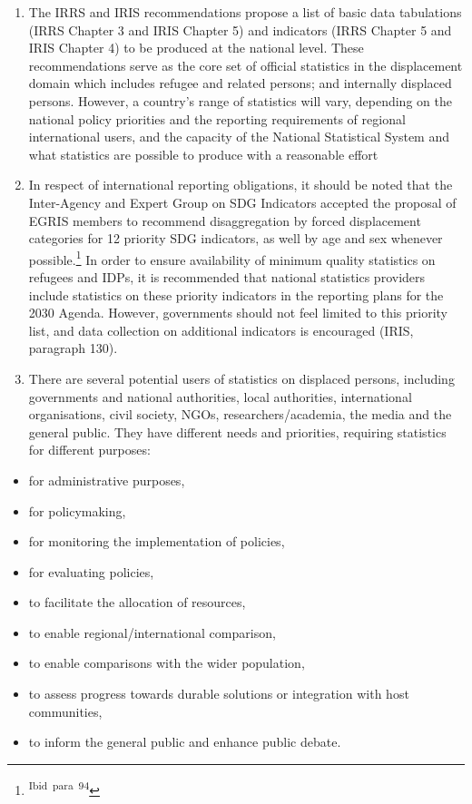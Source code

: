 \documentclass[
]{article}
\begin{document}
\begin{enumerate}
\def\labelenumi{\arabic{enumi}.}
\setcounter{enumi}{24}
\item
  The IRRS and IRIS recommendations propose a list of basic data
  tabulations (IRRS Chapter 3 and IRIS Chapter 5) and indicators (IRRS
  Chapter 5 and IRIS Chapter 4) to be produced at the national level.
  These recommendations serve as the core set of official statistics
  in the displacement domain which includes refugee and related
  persons; and internally displaced persons. However, a country's
  range of statistics will vary, depending on the national policy
  priorities and the reporting requirements of regional international
  users, and the capacity of the National Statistical System and what
  statistics are possible to produce with a reasonable effort
\item
  In respect of international reporting obligations, it should be
  noted that the Inter-Agency and Expert Group on SDG Indicators
  accepted the proposal of EGRIS members to recommend disaggregation
  by forced displacement categories for 12 priority SDG indicators, as
  well by age and sex whenever possible.\footnote{\textsuperscript{Ibid~para~94}} In order to ensure
  availability of minimum quality statistics on refugees and IDPs, it
  is recommended that national statistics providers include statistics
  on these priority indicators in the reporting plans for the 2030
  Agenda. However, governments should not feel limited to this
  priority list, and data collection on additional indicators is
  encouraged (IRIS, paragraph 130).
\item
  There are several potential users of statistics on displaced
  persons, including governments and national authorities, local
  authorities, international organisations, civil society, NGOs,
  researchers/academia, the media and the general public. They have
  different needs and priorities, requiring statistics for different
  purposes:
\end{enumerate}

\begin{itemize}
\item
  for administrative purposes,
\item
  for policymaking,
\item
  for monitoring the implementation of policies,
\item
  for evaluating policies,
\item
  to facilitate the allocation of resources,
\item
  to enable regional/international comparison,
\item
  to enable comparisons with the wider population,
\item
  to assess progress towards durable solutions or integration with
  host communities,
\item
  to inform the general public and enhance public debate.
\end{itemize}
\end{document}
